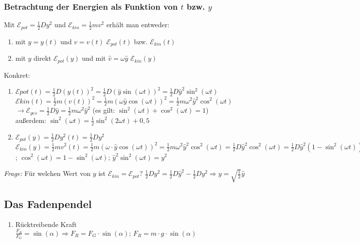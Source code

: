\documentclass[a4paper]{scrartcl}
\begin{document}
\subsubsection{Betrachtung der Energien als Funktion von \(t\) bzw. \(y\)}
Mit \(\mathcal{E}_{pot} = \frac{1}{2}Dy^2\) und \(\mathcal{E}_{kin} =
\frac{1}{2}mv^2\) erhält man entweder:
\begin{enumerate}
	\item mit \(y=y(t)\) und \(v=v(t)\) \(\mathcal{E}_{pot}(t)\) bzw.
		\(\mathcal{E}_{kin}(t)\)
	\item mit \(y\) direkt \(\mathcal{E}_{pot}(y)\) und  mit \(\hat{v}=\omega
		\hat{y}\) \(\mathcal{E}_{kin}(y)\)
\end{enumerate}
Konkret:
\begin{enumerate}
	\item \(\mathcal{E}{pot}(t) = \frac{1}{2} D (y(t))^2 = \frac{1}{2} D
		(\hat{y} \sin(\omega t))^2 = \frac{1}{2} D \hat{y}^2 \sin^2(\omega t)\)
		\\
		\(\mathcal{E}{kin}(t) = \frac{1}{2} m (v(t))^2 = \frac{1}{2} m
		(\omega \hat{y} \cos(\omega t))^2 = \frac{1}{2} m \omega^2 \hat{y}^2
		\cos^2(\omega t)\)
		\(\longrightarrow \mathcal{E}_{ges} = \frac{1}{2} D \hat{y} =
		\frac{1}{2} m \omega^2 \hat{y}^2\) (es gilt: \(\sin^2(\omega t) +
		\cos^2(\omega t) = 1\))
		\\
		außerdem: \(\sin^2(\omega t) = \frac{1}{2} \sin^2 (2 \omega t) + 0,5\)
	\item \(\mathcal{E}_{pot}(y) = \frac{1}{2} D y^2(t) = \frac{1}{2}D y^2\)
		\\
		\( \mathcal{E}_{kin}(y) = \frac{1}{2} m v^2(t) =  \frac{1}{2} m (\omega
		\cdot \hat{y} \cos(\omega t))^2 = \frac{1}{2} m \omega^2 \hat{y}^2
		\cos^2(\omega t) = \frac{1}{2} D \hat{y}^2 \cos^2(\omega t) =
		\frac{1}{2} D \hat{y}^2 ( 1 - \sin^2(\omega t) ) = \frac{1}{2} D
		\hat{y}^2 - \frac{1}{2} D \hat{y}^2 \sin^2(\omega t) = \frac{1}{2} D
		\hat{y}^2 - \frac{1}{2} D y^2 = \mathcal{E}_{ges} -
		\mathcal{E}_{pot} \); \( \cos^2(\omega t) = 1 - \sin^2(\omega t);\,
		\hat{y}^2 \sin^2(\omega t) = y^2 \)
\end{enumerate}
\emph{Frage:} Für welchen Wert von \(y\) ist \( \mathcal{E}_{kin} =
\mathcal{E}_{pot} \)? \( \frac{1}{2}Dy^2 = \frac{1}{2}D\hat{y}^2 - \frac{1}{2}
Dy^2 \Rightarrow y = \sqrt{\frac{1}{2}}\hat{y} \)

\subsection{Das Fadenpendel}
\begin{enumerate}
	\item Rücktreibende Kraft\\
		\( \frac{F_R}{F_G} = \sin(\alpha) \Rightarrow F_R = F_G \cdot
		\sin(\alpha);\, F_R = m \cdot g \cdot \sin(\alpha) \)
\end{enumerate}
\end{document}
